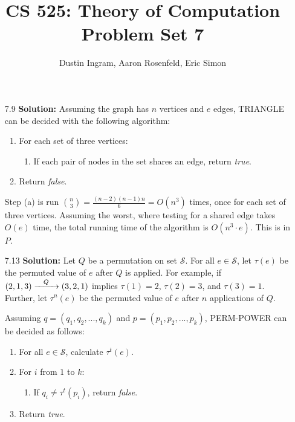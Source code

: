 \documentclass{article}
\title{CS 525: Theory of Computation\\ Problem Set 7}
\author{Dustin Ingram, Aaron Rosenfeld, Eric Simon}
\begin{document}
\maketitle
\begin{enumerate}
    \item[7.9]  \textbf{Solution:}
    Assuming the graph has $n$ vertices and $e$ edges, TRIANGLE can be decided
    with the following algorithm: 
    \begin{enumerate}
        \item For each set of three vertices:
        \begin{enumerate}
            \item If each pair of nodes in the set shares an edge, return \emph{true}.
        \end{enumerate}
        \item Return \emph{false}.
    \end{enumerate}

    Step (a) is run $\binom{n}{3} = \frac{(n-2)(n-1)n}{6} = O(n^3)$ times, once
    for each set of three vertices.  Assuming the worst, where testing for a
    shared edge takes $O(e)$ time, the total running time of the algorithm is
    $O(n^3 \cdot e)$.  This is in $P$.

    \item[7.13]  \textbf{Solution:} Let $Q$ be a permutation on set
    $\mathcal{S}$.  For all $e \in \mathcal{S}$, let $\tau(e)$ be the permuted
    value of $e$ after $Q$ is applied.  For example, if $(2,1,3)
    \xrightarrow{\hspace{3mm}Q\hspace{3mm}} (3,2,1)$ implies $\tau(1)=2$,
    $\tau(2)=3$, and $\tau(3)=1$.  Further, let $\tau^n(e)$ be the permuted
    value of $e$ after $n$ applications of $Q$.

    Assuming $q=(q_1,q_2,...,q_k)$ and $p=(p_1,p_2,...,p_k)$, PERM-POWER can be
    decided as follows:
    \begin{enumerate}
        \item For all $e\in\mathcal{S}$, calculate $\tau^t(e)$.
        \item For $i$ from $1$ to $k$:
        \begin{enumerate}
            \item If $q_i \neq \tau^t(p_i)$, return \emph{false}.
        \end{enumerate}
        \item Return \emph{true}.
    \end{enumerate}


\end{enumerate}
\end{document}
